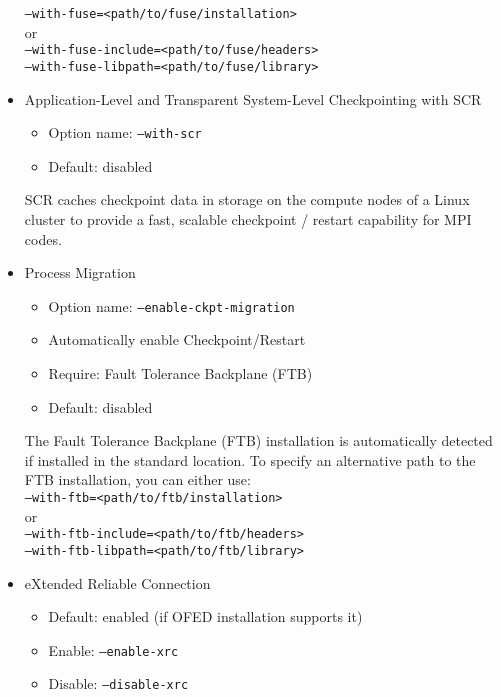 \begin{itemize}
        \texttt{--with-fuse=<path/to/fuse/installation> } \\
        or \\
        \texttt{--with-fuse-include=<path/to/fuse/headers> \\
                --with-fuse-libpath=<path/to/fuse/library>}

        \item Application-Level and Transparent System-Level Checkpointing with SCR
        \begin{itemize}
            \item Option name: \texttt{--with-scr}
            \item Default: disabled
        \end{itemize}

        SCR caches checkpoint data in storage on the compute nodes of a Linux
        cluster to provide a fast, scalable checkpoint / restart capability for MPI
        codes.

    \item Process Migration
        \begin{itemize}
          \item Option name: \texttt{--enable-ckpt-migration}
          \item Automatically enable Checkpoint/Restart
          \item Require: Fault Tolerance Backplane (FTB)
          \item Default: disabled
        \end{itemize}

        The Fault Tolerance Backplane (FTB) installation is automatically detected
        if installed in the standard location. To specify an alternative path to
        the FTB installation, you can either use:\\

        \texttt{--with-ftb=<path/to/ftb/installation> } \\
        or \\
        \texttt{--with-ftb-include=<path/to/ftb/headers> \\
                --with-ftb-libpath=<path/to/ftb/library>}


	\item eXtended Reliable Connection
		\begin{itemize}
			\item Default: enabled (if OFED installation supports it)
			\item Enable: \texttt{--enable-xrc}
			\item Disable: \texttt{--disable-xrc}
		\end{itemize}


\end{itemize}
